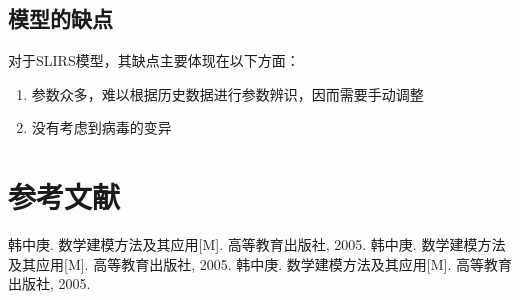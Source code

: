 \documentclass[bwprint]{gmcmthesis}
\numberwithin{figure}{section}
\begin{document}
\subsection{模型的缺点}
\par 对于SLIRS模型，其缺点主要体现在以下方面：
\begin{enumerate}
  \item 参数众多，难以根据历史数据进行参数辨识，因而需要手动调整
  \item 没有考虑到病毒的变异
  \end{enumerate}
\section{参考文献}
\begin{thebibliography}{1.2}%
\setlength{\itemsep}{-2mm}
 韩中庚. 数学建模方法及其应用[M]. 高等教育出版社, 2005.
 韩中庚. 数学建模方法及其应用[M]. 高等教育出版社, 2005.
 韩中庚. 数学建模方法及其应用[M]. 高等教育出版社, 2005.
\end{thebibliography}




\newpage
\appendix
\end{document}
